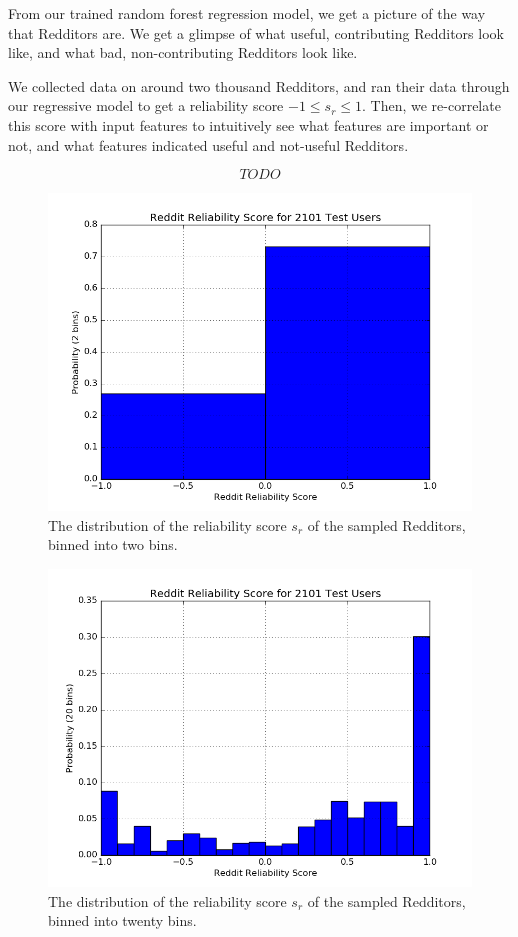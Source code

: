 From our trained random forest regression model, we get a picture of the way
that Redditors are. We get a glimpse of what useful, contributing Redditors look
like, and what bad, non-contributing Redditors look like.

We collected data on around two thousand Redditors, and ran their data through
our regressive model to get a reliability score $-1 \leq s_r \leq 1$. Then, we
re-correlate this score with input features to intuitively see what features are
important or not, and what features indicated useful and not-useful Redditors.

\[ TODO \]

\begin{figure}[tb]
    \centering
    \includegraphics[width=\linewidth]{figures/data_2.png}
    \caption{The distribution of the reliability score $s_r$ of the sampled Redditors, binned into two bins.}
    \label{fig:data_2}
\end{figure}

\begin{figure}[tb]
    \centering
    \includegraphics[width=\linewidth]{figures/data_20.png}
    \caption{The distribution of the reliability score $s_r$ of the sampled Redditors, binned into twenty bins.}
    \label{fig:data_20}
\end{figure}


